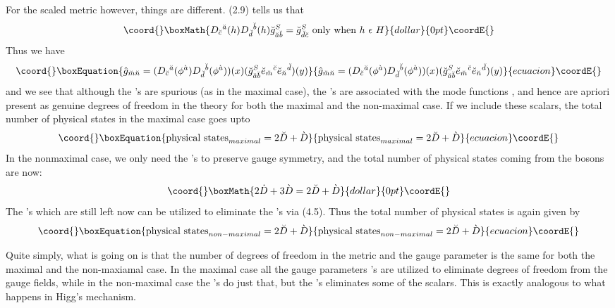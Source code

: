 \documentclass[a4paper,12pt]{article}
\begin{document}
For the scaled metric however, things are different. (2.9) tells us that 
$$\coord{}\boxMath{D_{\cs}{}^{\as}(h)D_{\ds}{}^{\bs}(h)\breve{g}_{\as\bs}^{S}=\breve{g}_{\ds\cs}^{S} \mbox{ only when } h\ \e\ H}{dollar}{0pt}\coordE{}$$
Thus we have 
\begin{equation}\coord{}\boxEquation{
\hat{g}_{\ms\ns}=(D_{\cs}{}^{\as}(\phi^{\az})D_{\ds}{}^{\bs}(\phi^{\az}))(x)(\breve{g}_{\as\bs}^S\es_{\ms}{}^{\cs}\es_{\ns}{}^{\ds})(y)
}{
\hat{g}_{\ms\ns}=(D_{\cs}{}^{\as}(\phi^{\az})D_{\ds}{}^{\bs}(\phi^{\az}))(x)(\breve{g}_{\as\bs}^S\es_{\ms}{}^{\cs}\es_{\ns}{}^{\ds})(y)
}{ecuacion}\coordE{}\end{equation}
and we see that although the \myHighlight{$\phi^{\ad}$}\coordHE{}'s are spurious (as in the maximal case), the \myHighlight{$\phi^{\az}$}\coordHE{}'s are associated with the mode functions \coordHE{}, and hence are apriori present as genuine degrees of freedom in the theory for both the maximal and the non-maximal case. If we include these scalars, the total number of physical states in the maximal case goes upto
\begin{equation}\coord{}\boxEquation{
\mbox{physical states}_{maximal}=2\breve{D}+\grave{D}
}{
\mbox{physical states}_{maximal}=2\breve{D}+\grave{D}
}{ecuacion}\coordE{}\end{equation}
In the nonmaximal case, we only need the \myHighlight{$\ze^{\ad}$}\coordHE{}'s to preserve gauge symmetry, and the total number of physical states coming from the bosons are now:
$$\coord{}\boxMath{2\dot{D}+3\grave{D}=2\breve{D}+\grave{D}}{dollar}{0pt}\coordE{}$$
The \myHighlight{$\ze^{\az}$}\coordHE{}'s which are still left now can be utilized to eliminate the \myHighlight{$\phi^{\az}$}\coordHE{}'s via (4.5). Thus the total number of physical states is again given by
\begin{equation}\coord{}\boxEquation{
\mbox{physical states}_{non-maximal}=2\breve{D}+\grave{D}
}{
\mbox{physical states}_{non-maximal}=2\breve{D}+\grave{D}
}{ecuacion}\coordE{}\end{equation}

Quite simply,  what is going on is that the number of degrees of freedom in the metric and the gauge parameter is the same for both the maximal and the non-maxiamal case. In the maximal case all the gauge parameters \myHighlight{$\ze^{\as}$}\coordHE{}'s are utilized to eliminate degrees of freedom from the gauge fields, while in the non-maximal case the \myHighlight{$\ze^{\ad}$}\coordHE{}'s do just that, but the \myHighlight{$\ze^{\az}$}\coordHE{}'s eliminates some of the scalars. This is exactly analogous to what happens in Higg's mechanism. 
\end{document}
